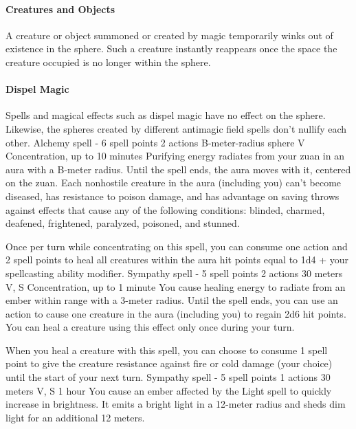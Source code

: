     \paragraph{Creatures and Objects}
    A creature or object summoned or created by magic temporarily winks out of existence in the sphere.
    Such a creature instantly reappears once the space the creature occupied is no longer within the sphere.

    \paragraph{Dispel Magic}
    Spells and magical effects such as dispel magic have no effect on the sphere.
    Likewise, the spheres created by different antimagic field spells don't nullify each other.
    {Alchemy spell - 6 spell points}
    {2 actions}
    {B-meter-radius sphere}
    {V}
    {Concentration, up to 10 minutes}
    Purifying energy radiates from your zuan in an aura with a B-meter radius.
    Until the spell ends, the aura moves with it, centered on the zuan.
    Each nonhostile creature in the aura (including you) can't become diseased, has resistance to poison damage, and has advantage on saving throws against effects that cause any of the following conditions: blinded, charmed, deafened, frightened, paralyzed, poisoned, and stunned.

    Once per turn while concentrating on this spell, you can consume one action and 2 spell points to heal all creatures within the aura hit points equal to 1d4 + your spellcasting ability modifier.
    {Sympathy spell - 5 spell points}
    {2 actions}
    {30 meters}
    {V, S}
    {Concentration, up to 1 minute}
    You cause healing energy to radiate from an ember within range with a 3-meter radius.
    Until the spell ends, you can use an action to cause one creature in the aura (including you) to regain 2d6 hit points.
    You can heal a creature using this effect only once during your turn.

    When you heal a creature with this spell, you can choose to consume 1 spell point to give the creature resistance against fire or cold damage (your choice) until the start of your next turn.
    {Sympathy spell - 5 spell points}
    {1 actions}
    {30 meters}
    {V, S}
    {1 hour}
    You cause an ember affected by the Light spell to quickly increase in brightness.
    It emits a bright light in a 12-meter radius and sheds dim light for an additional 12 meters.

